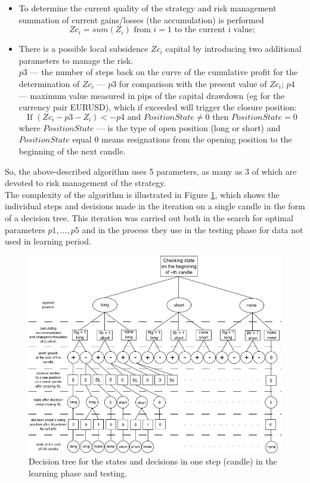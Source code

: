 \documentclass[runningheads,a4paper]{llncs}
\begin{document}
\begin{itemize}
\item To determine the current quality of the strategy and risk management summation of current gains/losses (the accumulation) is performed
\begin{equation}
Zc_i = sum ( Z_i ) \text{ from } i = 1 \text{ to the current i value;}
\end{equation}
\item There is a possible local subsidence $Zc_i$ capital by introducing two additional parameters to manage the risk.\\
$p3$ --- the number of steps back on the curve of the cumulative profit for the determination of $Zc_i$ --- $p3$ for comparison with the present value of $Zc_i$;
$p4$ --- maximum value measured in pips of the capital drawdown (eg for the currency pair EURUSD), which if exceeded will trigger the closure position:\\
\begin{equation}
\text{If } ( Zc_i - p3 - Z_i ) <- p4 \text{ and } PositionState \neq 0 \text{ then } PositionState = 0
\end{equation} 
where $PositionState$ --- is the type of open position (long or short) and $PositionState$ equal 0 means resignations from the opening position to the beginning of the next candle.
\end{itemize}
So, the above-described algorithm uses 5 parameters, as many as 3 of which are devoted to risk management of the strategy.\\
The complexity of the algorithm is illustrated in Figure \ref{fig:fig7}, which shows the individual steps and decisions made in the iteration on a single candle in the form of a decision tree. This iteration was carried out both in the search for optimal parameters $p1, ..., p5$ and in the process they use in the testing phase for data not used in learning period.\\
\begin{figure}[h!]
\centering
\includegraphics[width = \textwidth]{figures/rys7.png}
\caption{Decision tree for the states and decisions in one step (candle) in the learning phase and testing.}
\label{fig:fig7}
\end{figure}
\end{document}
